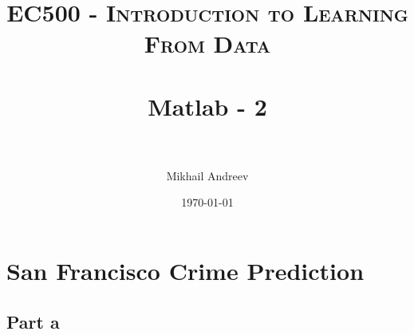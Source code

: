 \documentclass[paper=a4, fontsize=11pt]{scrartcl} %
\title{	
	\normalfont \normalsize 
	\textsc{EC500 - Introduction to Learning From Data} \\ [25pt] %
	\horrule{0.5pt} \\[0.4cm] %
	\huge Matlab - 2 \\ %
	\horrule{2pt} \\[0.5cm] %
}
\author{Mikhail Andreev} %
\date{\normalsize\today} %
\numberwithin{equation}{section} %
\numberwithin{figure}{section} %
\numberwithin{table}{section} %
\begin{document}
	
	\maketitle %
	
	
	\section{San Francisco Crime Prediction}
	
	\subsection{Part a}
	
\end{document}
